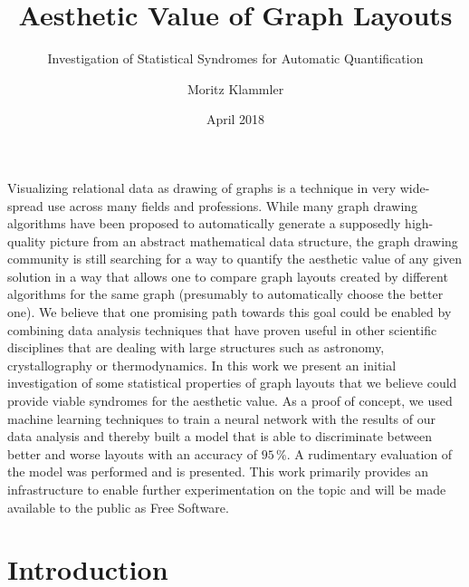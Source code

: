 \documentclass{beamer}
\title{Aesthetic Value of Graph Layouts}
\subtitle{Investigation of Statistical Syndromes for Automatic Quantification}
\author{Moritz Klammler}
\institute[Institute of Theoretical Computer Science]%
          {Master's Thesis of Moritz Klammler at the Institute of Theoretical Computer Science}
\date{April 2018}
\begin{document}
\begin{frame}
  \maketitle
\end{frame}

\begin{frame}
  \frametitle{\abstractname}
  \noindent\parbox{\textwidth}{%
    \footnotesize
    Visualizing relational data as drawing of graphs is a technique in very wide-spread use across many fields and
    professions.  While many graph drawing algorithms have been proposed to automatically generate a supposedly
    high-quality picture from an abstract mathematical data structure, the graph drawing community is still searching
    for a way to quantify the aesthetic value of any given solution in a way that allows one to compare graph layouts
    created by different algorithms for the same graph (presumably to automatically choose the better one).  We believe
    that one promising path towards this goal could be enabled by combining data analysis techniques that have proven
    useful in other scientific disciplines that are dealing with large structures such as astronomy, crystallography or
    thermodynamics.  In this work we present an initial investigation of some statistical properties of graph layouts
    that we believe could provide viable syndromes for the aesthetic value.  As a proof of concept, we used machine
    learning techniques to train a neural network with the results of our data analysis and thereby built a model that
    is able to discriminate between better and worse layouts with an accuracy of \(95\,\%\).  A rudimentary evaluation
    of the model was performed and is presented.  This work primarily provides an infrastructure to enable further
    experimentation on the topic and will be made available to the public as Free Software.
  }
\end{frame}

\begin{frame}
  \frametitle{\contentsname}
  \begin{multicols}{2}
    \tableofcontents
  \end{multicols}
\end{frame}

\section{Introduction}
\end{document}
